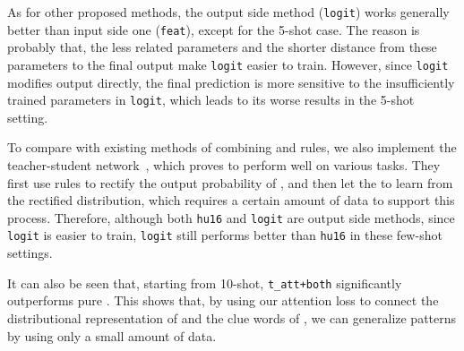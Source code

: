 As for other proposed methods, the output side method (\texttt{logit}) works generally better than input side one (\texttt{feat}), except for the 5-shot case.
The reason is probably that, the less \RE related parameters and the shorter distance from these parameters to the final output make \texttt{logit} easier to train.
However, since \texttt{logit} modifies output directly, the final prediction is more sensitive to the insufficiently trained parameters in \texttt{logit}, which leads to its worse results in the 5-shot setting.

To compare with existing methods of combining \NN and rules, we also implement the  teacher-student
network~\cite{hu2016harnessing}, which proves to perform well on various tasks. They first use \FOL rules to rectify the output probability
of \NN, and then let the \NN to learn from the rectified distribution, which requires a certain amount of data to support this process.
Therefore, although both \texttt{hu16} and \texttt{logit} are output side methods, since \texttt{logit} is easier to train, \texttt{logit}
still performs better than \texttt{hu16} in these few-shot settings.


It can also be seen that, starting from 10-shot, \texttt{t\_att+both} significantly outperforms pure \RE.
This shows that, by using our attention loss to connect the distributional representation of \NN and the clue words of \RE, we can generalize \RE patterns by using only a small amount of data.


